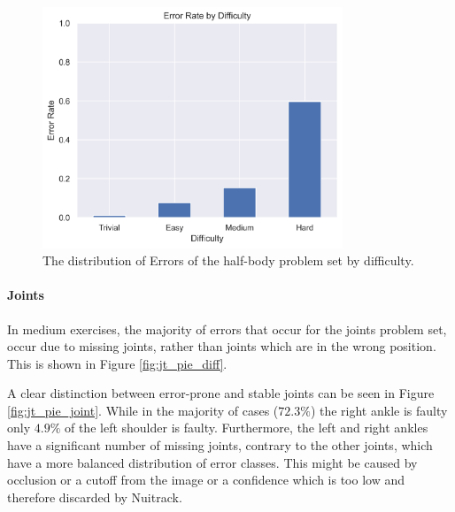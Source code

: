 \begin{figure}[ht]
  \centering
  \includegraphics[width=0.8\textwidth]{figures/Data/dist_limbs/Error_Rate_by_Difficulty.png}
  \caption[Error Distribution of the body parts by difficulty]{The distribution of Errors of the half-body problem set by difficulty.}
  \label{fig:lb_diff_dist}
\end{figure}

\paragraph{Joints}

In medium exercises, the majority of errors that occur for the joints problem set, occur due to missing joints, rather than joints which are in the wrong position. This is shown in Figure \ref{fig:jt_pie_diff}.

A clear distinction between error-prone and stable joints can be seen in Figure \ref{fig:jt_pie_joint}. While in the majority of cases ($72.3\%$) the right ankle is faulty only $4.9\%$ of the left shoulder is faulty. Furthermore, the left and right ankles have a significant number of missing joints, contrary to the other joints, which have a more balanced distribution of error classes. This might be caused by occlusion or a cutoff from the image or a confidence which is too low and therefore discarded by Nuitrack.

